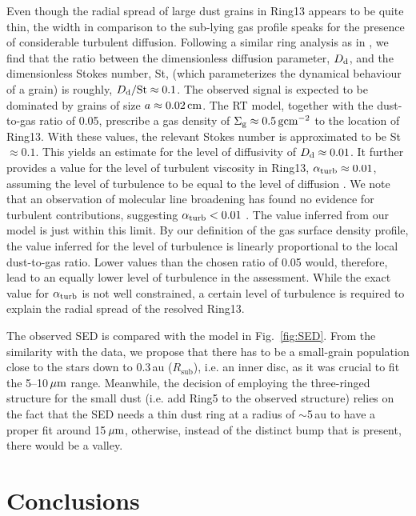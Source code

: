 \documentclass[fleqn,usenatbib,useAMS]{mnras}
\begin{document}
Even though the radial spread of large dust grains in Ring13 appears to be quite thin, the width in comparison to the sub-lying gas profile speaks for the presence of considerable turbulent diffusion. Following a similar ring analysis as in \citet{2018ApJ...869L..46D}, we find that the ratio between the dimensionless diffusion parameter, $D_{\rm d}$, and the dimensionless Stokes number, St, (which parameterizes the dynamical behaviour of a grain) is roughly, $D_{\rm d}/{\rm St}\approx 0.1$. The observed signal is expected to be dominated by grains of size $a\approx 0.02\,{\rm cm}$. The RT model, together with the dust-to-gas ratio of 0.05, prescribe a gas density of $\Sigma_{\rm g} \approx 0.5\,{\rm g}{\rm cm}^{-2}$ to the location of Ring13. With these values, the relevant Stokes number is approximated to be St$\approx 0.1$. This yields an estimate for the level of diffusivity of $D_{\rm d}\approx 0.01$. It further provides a value for the level of turbulent viscosity in Ring13, $\alpha_{\rm turb}\approx 0.01$, assuming the level of turbulence to be equal to the level of diffusion \citep{2007Icar..192..588Y}. We note that an observation of molecular line broadening has found no evidence for turbulent contributions, suggesting $\alpha_{\rm turb}<0.01$ \citep{Flaherty_2020}. The value inferred from our model is just within this limit. By our definition of the gas surface density profile, the value inferred for the level of turbulence is linearly proportional to the local dust-to-gas ratio. Lower values than the chosen ratio of 0.05 would, therefore, lead to an equally lower level of turbulence in the assessment. While the exact value for $\alpha_{\rm turb}$ is not well constrained, a certain level of turbulence is required to explain the radial spread of the resolved Ring13.

The observed SED is compared with the model in Fig.~\ref{fig:SED}. From the similarity with the data, we propose that there has to be a small-grain population close to the stars down to 0.3\,au ($R_{\mathrm{sub}}$), i.e. an inner disc, as it was crucial to fit the 5--10\,$\hbox{$\mu$m}$ range. Meanwhile, the decision of employing the three-ringed structure for the small dust (i.e. add Ring5 to the observed structure) relies on the fact that the SED needs a thin dust ring at a radius of $\sim$5\,au to have a proper fit around 15\,$\hbox{$\mu$m}$, otherwise, instead of the distinct bump that is present, there would be a valley.

\section{Conclusions} \label{sec:Conclusions}
\end{document}
